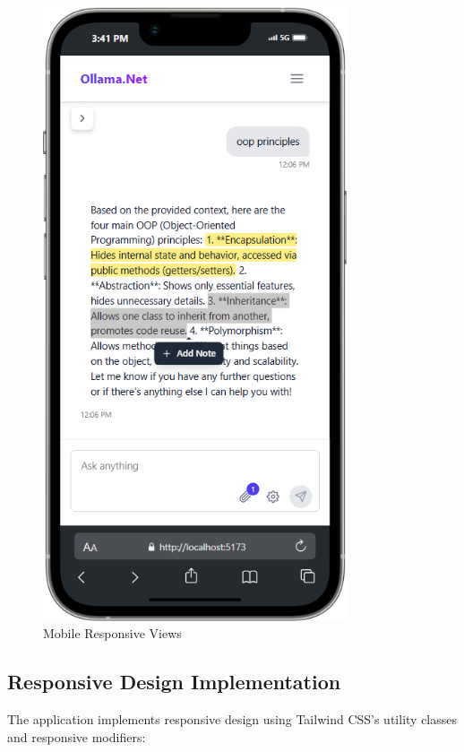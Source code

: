 \begin{figure}[h]
    \centering
    \includegraphics[width=0.8\textwidth]{./Chapter07/figures/mobile_responsive_views.png}
    \caption{Mobile Responsive Views}
    \label{fig:mobile-responsive-views}
\end{figure}

\subsection{Responsive Design Implementation}

The application implements responsive design using Tailwind CSS's utility classes and responsive modifiers:

